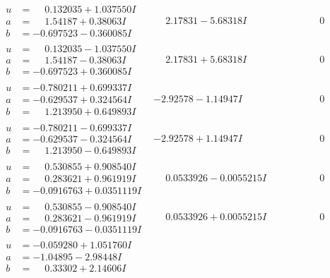 \documentclass[1p]{elsarticle_modified}
\theoremstyle{definition}
\begin{document}
$$\begin{array}{c|c|c}
\begin{aligned}
u &= \phantom{-}0.132035 + 1.037550 I \\
a &= \phantom{-}1.54187 + 0.38063 I \\
b &= -0.697523 - 0.360085 I\end{aligned}
 & \phantom{-}2.17831 - 5.68318 I & \phantom{-0.000000 } 0 \\ \hline\begin{aligned}
u &= \phantom{-}0.132035 - 1.037550 I \\
a &= \phantom{-}1.54187 - 0.38063 I \\
b &= -0.697523 + 0.360085 I\end{aligned}
 & \phantom{-}2.17831 + 5.68318 I & \phantom{-0.000000 } 0 \\ \hline\begin{aligned}
u &= -0.780211 + 0.699337 I \\
a &= -0.629537 + 0.324564 I \\
b &= \phantom{-}1.213950 + 0.649893 I\end{aligned}
 & -2.92578 - 1.14947 I & \phantom{-0.000000 } 0 \\ \hline\begin{aligned}
u &= -0.780211 - 0.699337 I \\
a &= -0.629537 - 0.324564 I \\
b &= \phantom{-}1.213950 - 0.649893 I\end{aligned}
 & -2.92578 + 1.14947 I & \phantom{-0.000000 } 0 \\ \hline\begin{aligned}
u &= \phantom{-}0.530855 + 0.908540 I \\
a &= \phantom{-}0.283621 + 0.961919 I \\
b &= -0.0916763 + 0.0351119 I\end{aligned}
 & \phantom{-}0.0533926 - 0.0055215 I & \phantom{-0.000000 } 0 \\ \hline\begin{aligned}
u &= \phantom{-}0.530855 - 0.908540 I \\
a &= \phantom{-}0.283621 - 0.961919 I \\
b &= -0.0916763 - 0.0351119 I\end{aligned}
 & \phantom{-}0.0533926 + 0.0055215 I & \phantom{-0.000000 } 0 \\ \hline\begin{aligned}
u &= -0.059280 + 1.051760 I \\
a &= -1.04895 - 2.98448 I \\
b &= \phantom{-}0.33302 + 2.14606 I\end{aligned}

\end{array}$$
\end{document}
